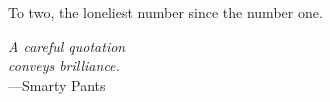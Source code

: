 %
\begin{frontmatter}

%
%
\makefrontmatter

%
%
%
%
%
%
\begin{dedication}
  To two, the loneliest number since the number one.
\end{dedication}


%
%



%
%
\begin{epigraph} %
  \emph{A careful quotation\\
  conveys brilliance.}\\
  ---Smarty Pants
\end{epigraph}

%



\end{frontmatter}
